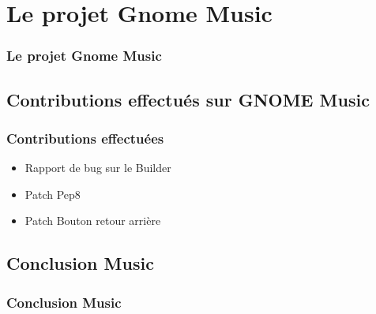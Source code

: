 \documentclass{beamer}
\begin{document}
\section{Le projet Gnome Music}
\begin{frame}
  \frametitle{Le projet Gnome Music}
\end{frame}

\subsection{Contributions effectués sur GNOME Music}
\begin{frame}
  \frametitle{Contributions effectuées}
  \begin{itemize}
  \item Rapport de bug sur le Builder
  \item Patch Pep8
  \item Patch Bouton retour arrière
  \end{itemize}
\end{frame}

\subsection{Conclusion Music}
\begin{frame}
  \frametitle{Conclusion Music}
\end{frame}
\end{document}
